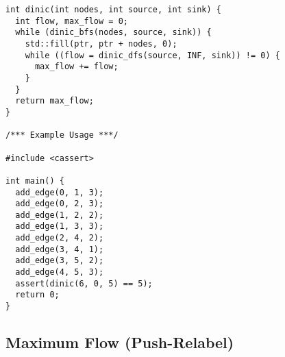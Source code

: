 \begin{lstlisting}
int dinic(int nodes, int source, int sink) {
  int flow, max_flow = 0;
  while (dinic_bfs(nodes, source, sink)) {
    std::fill(ptr, ptr + nodes, 0);
    while ((flow = dinic_dfs(source, INF, sink)) != 0) {
      max_flow += flow;
    }
  }
  return max_flow;
}

/*** Example Usage ***/

#include <cassert>

int main() {
  add_edge(0, 1, 3);
  add_edge(0, 2, 3);
  add_edge(1, 2, 2);
  add_edge(1, 3, 3);
  add_edge(2, 4, 2);
  add_edge(3, 4, 1);
  add_edge(3, 5, 2);
  add_edge(4, 5, 3);
  assert(dinic(6, 0, 5) == 5);
  return 0;
}
\end{lstlisting}
\subsection{Maximum Flow (Push-Relabel)}

